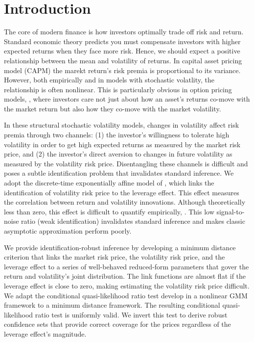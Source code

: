 \documentclass[11pt, letterpaper, twoside]{article}
\begin{document}
\tableofcontents
\clearpage

\section{Introduction}

The core of modern finance is how investors optimally trade off risk and return.  Standard economic theory predicts you must compensate investors with higher expected returns when they face more risk.  Hence, we should expect a positive relationship between the mean and volatility of returns. In  capital asset pricing model (CAPM) the marekt return's risk premia is proportional to its variance. However, both empirically and in models with stochastic volatlity, the relationship is often nonlinear. 
This is particularly obvious in  option pricing models, \parencite{christoffersen2013capturing}, where investors care not just about how an asset's returns co-move with the market return but also how they co-move with the market volatility.

In these structural stochastic volatility models, changes in volatility affect risk premia through two channels: (1) the investor's willingness to tolerate high volatility in order to get high expected returns as measured by the market risk price, and (2) the investor’s direct aversion to changes in future volatility as measured by the volatility risk price. Disentangling these channels is difficult and poses a subtle identification problem that invalidates standard inference. We adopt the discrete-time exponentially affine model of \textcite{han2018leverage}, which links the identification of volatility risk price to the leverage effect. This effect measures the correlation between return and volatility innovations. Although theoretically less than zero, this effect is difficult to quantify empirically, \parencite{aitsahalia2013leverage}. This low signal-to-noise ratio (weak identification) invalidates standard inference and makes classic asymptotic approximation perform poorly.


We provide identification-robust inference by developing a minimum distance criterion that links the market risk price, the volatility risk price, and the leverage effect to a series of well-behaved reduced-form parameters that  gover  the return and volatility's joint distribution. The link functions are almost flat if the leverage effect is close to zero, making estimating the volatility risk price difficult. We adapt the conditional  quasi-likelihood ratio test \textcite{andrews2016conditional} develop in a nonlinear GMM framework to a minimum  distance framework. The resulting conditional quasi-likelihood ratio test is uniformly valid. We invert this test  to derive robust confidence sets that provide correct coverage for the prices regardless of the leverage effect's
magnitude. 
\end{document}
